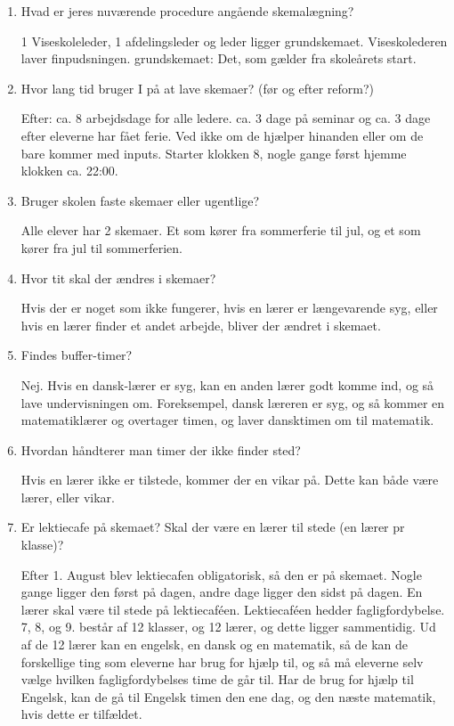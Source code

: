 \begin{enumerate}
	\item Hvad er jeres nuværende procedure angående skemalægning?
	
	1 Viseskoleleder, 1 afdelingsleder og leder ligger grundskemaet. Viseskolederen laver finpudsningen.
	grundskemaet: Det, som gælder fra skoleårets start.
	\item Hvor lang tid bruger I på at lave skemaer? (før og efter reform?)
	
	Efter: ca. 8 arbejdsdage for alle ledere. ca. 3 dage på seminar og ca. 3 dage efter eleverne har fået ferie. Ved ikke om de hjælper hinanden eller om de bare kommer med inputs. Starter klokken 8, nogle gange først hjemme klokken ca. 22:00.
	\item Bruger skolen faste skemaer eller ugentlige?
	
	Alle elever har 2 skemaer. Et som kører fra sommerferie til jul, og et som kører fra jul til sommerferien.
	\item Hvor tit skal der ændres i skemaer?
	
	Hvis der er noget som ikke fungerer, hvis en lærer er længevarende syg, eller hvis en lærer finder et andet arbejde, bliver der ændret i skemaet.
	\item Findes buffer-timer? 
	
	Nej. Hvis en dansk-lærer er syg, kan en anden lærer godt komme ind, og så lave undervisningen om. Foreksempel, dansk læreren er syg, og så kommer en matematiklærer og overtager timen, og laver dansktimen om til matematik.
	\item Hvordan håndterer man timer der ikke finder sted?
	
	Hvis en lærer ikke er tilstede, kommer der en vikar på. Dette kan både være lærer, eller vikar.
	\item Er lektiecafe på skemaet? Skal der være en lærer til stede (en lærer pr klasse)?
	
	Efter 1. August blev lektiecafen obligatorisk, så den er på skemaet. Nogle gange ligger den først på dagen, andre dage ligger den sidst på dagen.
	En lærer skal være til stede på lektiecaféen. Lektiecaféen hedder fagligfordybelse. 7, 8, og 9. består af 12 klasser, og 12 lærer, og dette ligger sammentidig. Ud af de 12 lærer kan en engelsk, en dansk og en matematik, så de kan de forskellige ting som eleverne har brug for hjælp til, og så må eleverne selv vælge hvilken fagligfordybelses time de går til. Har de brug for hjælp til Engelsk, kan de gå til Engelsk timen den ene dag, og den næste matematik, hvis dette er tilfældet.
	

\end{enumerate}
